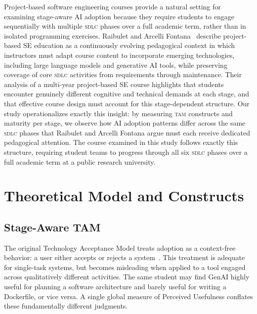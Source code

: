 \documentclass[sigconf,anonymous]{acmart}
\newcommand{\TAM}{\textsc{tam}\xspace}
\newcommand{\SDLC}{\textsc{sdlc}\xspace}
\newcommand{\GenAI}{GenAI\xspace}
\begin{document}
Project-based software engineering courses provide a natural setting for
examining stage-aware AI adoption because they require students to engage
sequentially with multiple \SDLC phases over a full academic term, rather
than in isolated programming exercises. Raibulet and Arcelli
Fontana~\cite{raibulet2025} describe project-based SE education as a
continuously evolving pedagogical context in which instructors must
adapt course content to incorporate emerging technologies, including
large language models and generative AI tools, while preserving
coverage of core \SDLC activities from requirements through maintenance.
Their analysis of a multi-year project-based SE course highlights that
students encounter genuinely different cognitive and technical demands
at each stage, and that effective course design must account for this
stage-dependent structure. Our study operationalizes exactly this
insight: by measuring \TAM constructs and maturity per stage, we observe
how AI adoption patterns differ across the same \SDLC phases that
Raibulet and Arcelli Fontana argue must each receive dedicated
pedagogical attention. The course examined in this study follows
exactly this structure, requiring student teams to progress through
all six \SDLC phases over a full academic term at a public research
university.

\section{Theoretical Model and Constructs}
\label{sec:model}

\subsection{Stage-Aware TAM}
The original Technology Acceptance Model treats adoption as a
context-free behavior: a user either accepts or rejects a
system~\cite{davis1989a, davis1989b}. This treatment is adequate for
single-task systems, but becomes misleading when applied to a tool
engaged across qualitatively different activities. The same student
may find \GenAI highly useful for planning a software architecture
and barely useful for writing a Dockerfile, or vice versa. A single
global measure of Perceived Usefulness conflates these fundamentally
different judgments.
\end{document}
